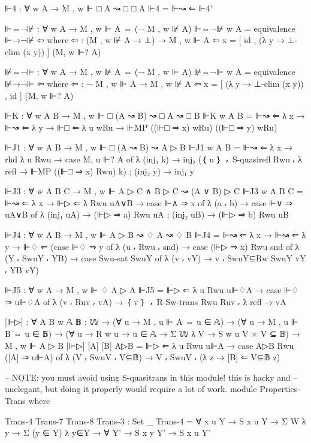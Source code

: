 \begin{spverbatim}
      ⊩4 : ∀ {w A} → M , w ⊩ □ A ↝ □ □ A
      ⊩4 = ⊩↝ ⇐ ⊩4'

      ⊩⇔¬⊮ : ∀ {w A} → M , w ⊩ A ⇔ (¬ M , w ⊮ A)
      ⊩⇔¬⊮ {w} {A} = equivalence ⊩→¬⊮ ⇦
        where
        ⇦ : (M , w ⊮ A → ⊥) → M , w ⊩ A
        ⇦ x = [ id , (λ y → ⊥-elim (x y)) ] (M, w ⊩? A)

      ⊮⇔¬⊩ : ∀ {w A} → M , w ⊮ A ⇔ (¬ M , w ⊩ A)
      ⊮⇔¬⊩ {w} {A} = equivalence ⊮→¬⊩ ⇦
        where
        ⇦ : ¬ M , w ⊩ A → M , w ⊮ A
        ⇦ x = [ (λ y → ⊥-elim (x y)) , id ] (M, w ⊩? A)

      ⊩K : ∀ {w A B} → M , w ⊩ □ (A ↝ B) ↝ □ A ↝ □ B
      ⊩K {w} {A} {B} = ⊩↝ ⇐ λ x → ⊩↝ ⇐ λ y → ⊩□ ⇐
        λ {u} wRu → ⊩MP ((⊩□ ⇒ x) wRu) ((⊩□ ⇒ y) wRu)


      ⊩J1 : ∀ {w A B} → M , w ⊩ □ (A ↝ B) ↝ A ▷ B
      ⊩J1 {w} {A} {B} = ⊩↝ ⇐ λ x → rhd λ { {u} Rwu → case M, u ⊩? A of
        λ { (inj₁ k) → inj₂ (｛ u ｝ ⸴ S-quasirefl Rwu ⸴
        λ {refl → ⊩MP ((⊩□ ⇒ x) Rwu) k})
        ; (inj₂ y) → inj₁ y}}


      ⊩J3 : ∀ {w A B C} → M , w ⊩ A ▷ C ∧ B ▷ C ↝ (A ∨ B) ▷ C
      ⊩J3 {w} {A} {B} {C} = ⊩↝ ⇐ λ x → ⊩▷ ⇐ λ Rwu uA∨B → case ⊩∧ ⇒ x of
        λ {(a ⸴ b) → case ⊩∨ ⇒ uA∨B of
        λ { (inj₁ uA) → (⊩▷ ⇒ a) Rwu uA ;
        (inj₂ uB) → (⊩▷ ⇒ b) Rwu uB} }

      ⊩J4 : ∀ {w A B} → M , w ⊩ A ▷ B ↝ ♢ A ↝ ♢ B
      ⊩J4 = ⊩↝ ⇐ λ x → ⊩↝ ⇐ λ y → ⊩♢ ⇐ (case ⊩♢ ⇒ y of
        λ { (u ⸴ Rwu ⸴ snd) → case (⊩▷ ⇒ x) Rwu snd of
        λ { (Y ⸴ SwuY ⸴ YB) → case Swu-sat SwuY of
        λ { (v ⸴ vY) → v ⸴ SwuY⊆Rw SwuY vY ⸴ YB vY}}})

      ⊩J5 : ∀ {w A} → M , w ⊩ ♢ A ▷ A
      ⊩J5 = ⊩▷ ⇐ λ {u} Rwu u⊩♢A → case ⊩♢ ⇒ u⊩♢A of
        λ { (v ⸴ Ruv ⸴ vA) → ｛ v ｝ ⸴ R-Sw-trans Rwu Ruv
          ⸴ λ {refl → vA}}

      [⊩▷] : ∀ {A B w} {𝔸 𝔹 : 𝕎}
        → (∀ {u} → M , u ⊩ A ⇔ u ∈ 𝔸)
        → (∀ {u} → M , u ⊩ B ⇔ u ∈ 𝔹)
        → (∀ {u} → R w u → u ∈ 𝔸 → Σ 𝕎 λ V → S w u V × V ⊆ 𝔹)
        → M , w ⊩ A ▷ B
      [⊩▷] [A] [B] A▷B = ⊩▷ ⇐ λ { {u} Rwu u⊩A → case A▷B Rwu ([A] ⇒ u⊩A) of
        λ { (V ⸴ SwuV ⸴ V⊆𝔹) → V ⸴ SwuV ⸴ (λ {z → [B] ⇐ V⊆𝔹 z})}}

      -- NOTE: you must avoid using S-quasitrans in this module! this is hacky and
      -- unelegant, but doing it properly would require a lot of work.
      module Properties-Trans where

        Trans-4 Trans-7 Trans-8 Trans-3 : Set _
        Trans-4 = ∀ {x u Y} → S x u Y → Σ W λ y → Σ (y ∈ Y) λ y∈Y → ∀ {Y'} → S x y Y' → S x u Y'


\end{spverbatim}
